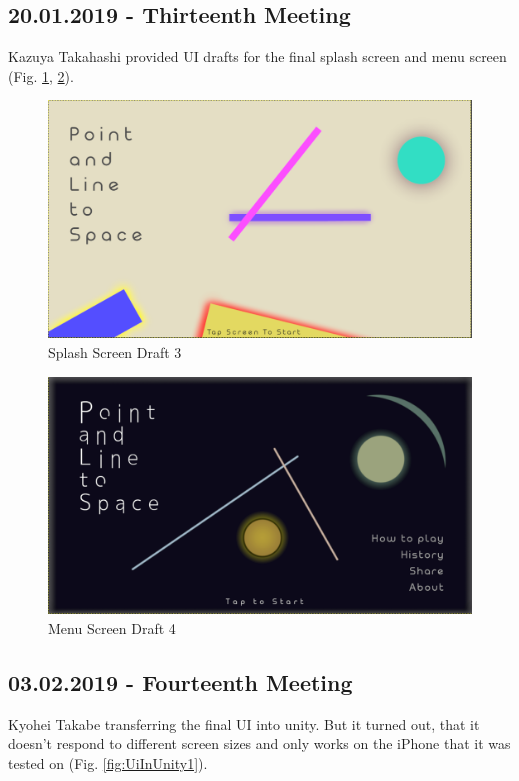 \subsection{20.01.2019 - Thirteenth Meeting}
Kazuya Takahashi provided UI drafts for the final splash screen and menu screen (Fig. \ref{fig:splash1}, \ref{fig:splash2}).

\begin{figure}[htbp]
	\centering
		\includegraphics[width=1.00\textwidth]{img/splash1.png}
	\caption[Splash Screen Draft 3]{Splash Screen Draft 3}
	\label{fig:splash1}
\end{figure}

\begin{figure}[htbp]
	\centering
		\includegraphics[width=1.00\textwidth]{img/splash2.png}
	\caption[Menu Screen Draft 4]{Menu Screen Draft 4}
	\label{fig:splash2}
\end{figure}

\subsection{03.02.2019  - Fourteenth Meeting}
Kyohei Takabe transferring the final UI into unity. But it turned out, that it doesn’t respond to different screen sizes and only works on the iPhone that it was tested on (Fig. \ref{fig:UiInUnity1}). 

